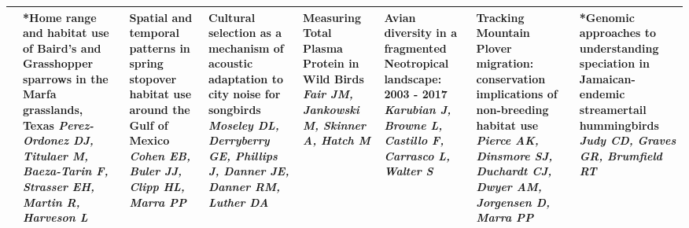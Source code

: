 \begin{tabular}{|x{0.85cm}|x{2.85cm}|x{2.85cm}|x{2.85cm}|x{2.85cm}|x{2.85cm}|a{2.85cm}|a{2.85cm}|}
&*Home range and habitat use of Baird's and Grasshopper sparrows in the Marfa grasslands, Texas \newline \newline \textit{Perez-Ordonez DJ, Titulaer M, Baeza-Tarin F, Strasser EH, Martin R, Harveson L} & Spatial and temporal patterns in spring stopover habitat use around the Gulf of Mexico \newline \newline \textit{Cohen EB, Buler JJ, Clipp HL, Marra PP} & Cultural selection as a mechanism of acoustic adaptation to city noise for songbirds \newline \newline \textit{Moseley DL, Derryberry GE, Phillips J, Danner JE, Danner RM, Luther DA} & Measuring Total Plasma Protein in Wild Birds \newline \newline \textit{Fair JM, Jankowski M, Skinner A, Hatch M} & Avian diversity in a fragmented Neotropical landscape: 2003 - 2017 \newline \newline \textit{Karubian J, Browne L, Castillo F, Carrasco L, Walter S} & Tracking Mountain Plover migration: conservation implications of non-breeding habitat use \newline \newline \textit{Pierce AK, Dinsmore SJ, Duchardt CJ, Dwyer AM, Jorgensen D, Marra PP} & *Genomic approaches to understanding speciation in Jamaican-endemic streamertail hummingbirds \newline \newline \textit{Judy CD, Graves GR, Brumfield RT}\\
\hline

\end{tabular}
